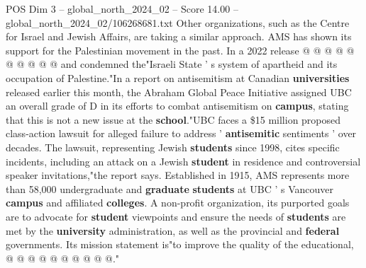\begin{textsample}{POS Dim 3 – global\_north\_2024\_02 – Score 14.00 – global\_north\_2024\_02/106268681.txt}
Other organizations, such as the Centre for Israel and Jewish Affairs, are taking a similar approach.
AMS has shown its support for the Palestinian movement in the past.
In a 2022 release @ @ @ @ @ @ @ @ @ @ and condemned the"Israeli State ' s system of apartheid and its occupation of Palestine."In a report on antisemitism at Canadian \textbf{universities} released earlier this month, the Abraham Global Peace Initiative assigned UBC an overall grade of D in its efforts to combat antisemitism on \textbf{campus}, stating that this is not a new issue at the \textbf{school}."UBC faces a \$15 million proposed class-action lawsuit for alleged failure to address ' \textbf{antisemitic} sentiments ' over decades.
The lawsuit, representing Jewish \textbf{students} since 1998, cites specific incidents, including an attack on a Jewish \textbf{student} in residence and controversial speaker invitations,"the report says.
Established in 1915, AMS represents more than 58,000 undergraduate and \textbf{graduate} \textbf{students} at UBC ' s Vancouver \textbf{campus} and affiliated \textbf{colleges}.
A non-profit organization, its purported goals are to advocate for \textbf{student} viewpoints and ensure the needs of \textbf{students} are met by the \textbf{university} administration, as well as the provincial and \textbf{federal} governments.
Its mission statement is"to improve the quality of the educational, @ @ @ @ @ @ @ @ @ @."

\end{textsample}
